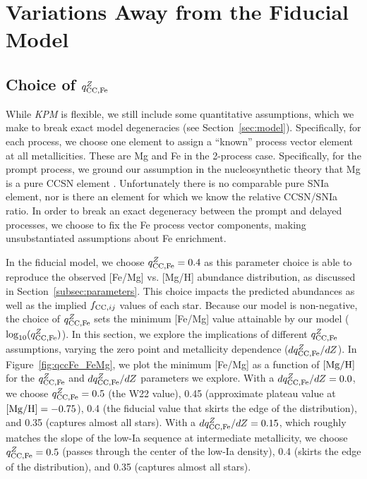 \documentclass[modern]{aastex631}
\newcommand{\mgh}{[{\rm Mg}/{\rm H}]}
\newcommand{\qccFe}{q_{{\rm CC, Fe}}^{Z}}
\newcommand{\dqccFe}{dq_{{\rm CC, Fe}}^{Z}/dZ}
\newcommand{\fcc}{f_{{\rm CC}, ij}}
\newcommand{\name}{\textsl{KPM}}
\begin{document}
\section{Variations Away from the Fiducial Model} \label{sec:variations}

\subsection{Choice of $\qccFe$} \label{subsec:qccFe}

While \name{} is flexible, we still include some quantitative assumptions, which we make to break exact model degeneracies (see Section~\ref{sec:model}).
Specifically, for each process, we choose one element to assign a ``known'' process vector element at all metallicities.
These are Mg and Fe in the 2-process case.
Specifically, for the prompt process, we ground our assumption in the nucleosynthetic theory that Mg is a pure CCSN element \citep[e.g.,][]{andrews2017}.
Unfortunately there is no comparable pure SNIa element, nor is there an element for which we know the relative CCSN/SNIa ratio.
In order to break an exact degeneracy between the prompt and delayed processes, we choose to fix the Fe process vector components, making unsubstantiated assumptions about Fe enrichment.

In the fiducial model, we choose $\qccFe = 0.4$ as this parameter choice is able to reproduce the observed [Fe/Mg] vs. [Mg/H] abundance distribution, as discussed in Section~\ref{subsec:parameters}. This choice impacts the predicted abundances as well as the implied $\fcc$ values of each star. Because our model is non-negative, the choice of $\qccFe$ sets the minimum [Fe/Mg] value attainable by our model ($\log_{10}(\qccFe)$). In this section, we explore the implications of different $\qccFe$ assumptions, varying the zero point and metallicity dependence ($\dqccFe$). In Figure~\ref{fig:qccFe_FeMg}, we plot the minimum [Fe/Mg] as a function of $\mgh$ for the $\qccFe$ and $\dqccFe$ parameters we explore. With a $\dqccFe=0.0$, we choose $\qccFe=0.5$ (the W22 value), 0.45 (approximate plateau value at $\mgh=-0.75$), 0.4 (the fiducial value that skirts the edge of the distribution), and 0.35 (captures almost all stars). With a $\dqccFe=0.15$, which roughly matches the slope of the low-Ia sequence at intermediate metallicity, we choose $\qccFe=0.5$ (passes through the center of the low-Ia density), 0.4 (skirts the edge of the distribution), and 0.35 (captures almost all stars).
\end{document}
